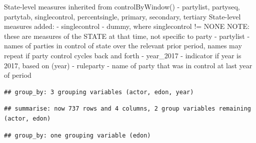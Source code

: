 \documentclass[]{article}
\newenvironment{Shaded}{\begin{snugshade}}{\end{snugshade}}
\newcommand{\CommentTok}[1]{\textcolor[rgb]{0.56,0.35,0.01}{\textit{#1}}}
\newcommand{\DataTypeTok}[1]{\textcolor[rgb]{0.13,0.29,0.53}{#1}}
\newcommand{\DecValTok}[1]{\textcolor[rgb]{0.00,0.00,0.81}{#1}}
\newcommand{\KeywordTok}[1]{\textcolor[rgb]{0.13,0.29,0.53}{\textbf{#1}}}
\newcommand{\NormalTok}[1]{#1}
\newcommand{\OperatorTok}[1]{\textcolor[rgb]{0.81,0.36,0.00}{\textbf{#1}}}
\newcommand{\OtherTok}[1]{\textcolor[rgb]{0.56,0.35,0.01}{#1}}
\newcommand{\StringTok}[1]{\textcolor[rgb]{0.31,0.60,0.02}{#1}}
\begin{document}
State-level measures inherited from controlByWindow() - partylist,
partyseq, partytab, singlecontrol, percentsingle, primary, secondary,
tertiary State-level measures added: - singlecontrol - dummy, where
singlecontrol != NONE NOTE: these are measures of the STATE at that
time, not specific to party - partylist - names of parties in control of
state over the relevant prior period, names may repeat if party control
cycles back and forth - year\_2017 - indicator if year is 2017, based on
(year) - ruleparty - name of party that was in control at last year of
period

\begin{Shaded}
\end{Shaded}

\begin{verbatim}
## group_by: 3 grouping variables (actor, edon, year)
\end{verbatim}

\begin{verbatim}
## summarise: now 737 rows and 4 columns, 2 group variables remaining (actor, edon)
\end{verbatim}

\begin{Shaded}
\end{Shaded}

\begin{verbatim}
## group_by: one grouping variable (edon)
\end{verbatim}
\end{document}
